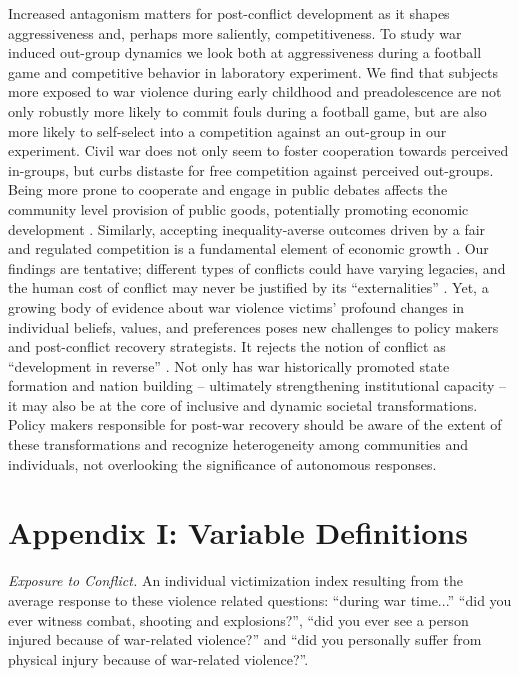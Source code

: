 Increased antagonism matters for post-conflict development as it shapes aggressiveness and, perhaps more saliently, competitiveness. To study war induced out-group dynamics we look both at aggressiveness during a football game and competitive behavior in laboratory experiment. We find that subjects more exposed to war violence during early childhood and preadolescence are not only robustly more likely to commit fouls during a football game, but are also more likely to self-select into a competition against an out-group in our experiment. Civil war does not only seem to foster cooperation towards perceived in-groups, but curbs distaste for free competition against perceived out-groups. Being more prone to cooperate and engage in public debates affects the community level provision of public goods, potentially promoting economic development \citep{Bellows2009b}. Similarly, accepting inequality-averse outcomes driven by a fair and regulated competition is a fundamental element of economic growth \citep{Bartling2009b}
. 
Our findings are tentative; different types of conflicts could have varying legacies, and the human cost of conflict may never be justified by its ``externalities'' \citep{CassarAlessandra}. Yet, a growing body of evidence about war violence victims’ profound changes in individual beliefs, values, and preferences poses new challenges to policy makers and post-conflict recovery strategists. It rejects the notion of conflict as ``development in reverse'' \cite{Collier2003}. Not only has war historically promoted state formation and nation building – ultimately strengthening institutional capacity \citep{Tilly1975} -- it may also be at the core of inclusive and dynamic societal transformations. Policy makers responsible for post-war recovery should be aware of the extent of these transformations and recognize heterogeneity among communities and individuals, not overlooking the significance of autonomous responses.




\clearpage 






\clearpage
\section*{Appendix I: Variable Definitions}

\textit{Exposure to Conflict.} An individual victimization index resulting from the average response to these violence related questions: ``during war time...'' ``did you ever witness combat, shooting and explosions?'', ``did you ever see a person injured because of war-related violence?'' and ``did you personally suffer from physical injury because of war-related violence?''.

